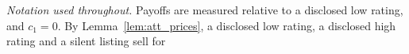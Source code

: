 \noindent\emph{Notation used throughout.} Payoffs are measured relative to a disclosed low rating, and $c_1=0$. By Lemma~\ref{lem:att_prices}, a disclosed low rating, a disclosed high rating and a silent listing sell for

